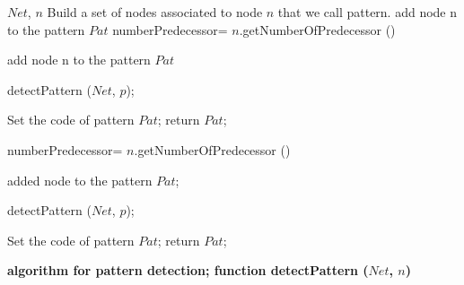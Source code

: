 \begin{algorithm}
\begin{algorithmic}[1]
\REQUIRE $Net$, $n$ 
\ENSURE Build a set of nodes associated to node $n$ that we call pattern.
   \STATE add node n to the pattern $Pat$
   \STATE numberPredecessor= $n$.getNumberOfPredecessor () %
   
      \STATE add node n to the pattern $Pat$
    \ENDCASE
    
      \STATE detectPattern ($Net$, $p$);
    \ENDCASE
    
    \ENDSWITCH
   \ENDFOR
      \STATE Set the code of pattern $Pat$;
      \STATE return $Pat$;
   \ENDCASE
   
   \ENDSWITCH
\ENDCASE
   
   \STATE numberPredecessor= $n$.getNumberOfPredecessor () %
   
      \STATE added node to the pattern $Pat$;
    \ENDCASE
    
      \STATE detectPattern ($Net$, $p$);
    \ENDCASE
    
    \ENDSWITCH
   \ENDFOR
      \STATE Set the code of pattern $Pat$;
      \STATE return $Pat$;
   \ENDCASE
   
   \ENDSWITCH
\ENDCASE
\ENDSWITCH
\end{algorithmic}
\caption{\bf algorithm for pattern detection; function detectPattern ($Net$, $n$)} \label{PatternDetection}
\end{algorithm}



